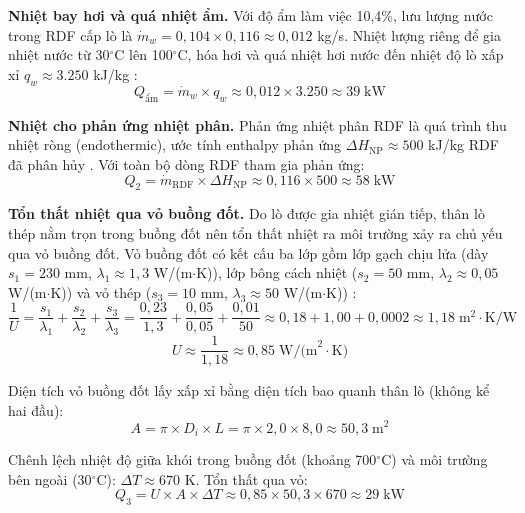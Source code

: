 \documentclass[../main.tex]{subfiles}
\begin{document}
\textbf{Nhiệt bay hơi và quá nhiệt ẩm.} Với độ ẩm làm việc 10,4\%, lưu lượng nước trong RDF cấp lò là $\dot{m}_w = 0{,}104 \times 0{,}116 \approx 0{,}012$ kg/s. Nhiệt lượng riêng để gia nhiệt nước từ 30$^\circ\mathrm{C}$ lên 100$^\circ\mathrm{C}$, hóa hơi và quá nhiệt hơi nước đến nhiệt độ lò xấp xỉ $q_w \approx 3.250$ kJ/kg \cite{Incropera2011}:
\begin{equation}
Q_{\text{ẩm}} = \dot{m}_w \times q_w \approx 0{,}012 \times 3.250 \approx 39\;\text{kW}
\label{eq:Q-am}
\end{equation}

\textbf{Nhiệt cho phản ứng nhiệt phân.} Phản ứng nhiệt phân RDF là quá trình thu nhiệt ròng (endothermic), ước tính enthalpy phản ứng $\Delta H_{\text{NP}} \approx 500$ kJ/kg RDF đã phân hủy \cite{Basu2013}. Với toàn bộ dòng RDF tham gia phản ứng:
\begin{equation}
Q_2 = \dot{m}_{\text{RDF}} \times \Delta H_{\text{NP}}
\approx 0{,}116 \times 500 \approx 58\;\text{kW}
\label{eq:Q2-phan-ung}
\end{equation}

\textbf{Tổn thất nhiệt qua vỏ buồng đốt.} Do lò được gia nhiệt gián tiếp, thân lò thép nằm trọn trong buồng đốt nên tổn thất nhiệt ra môi trường xảy ra chủ yếu qua vỏ buồng đốt. Vỏ buồng đốt có kết cấu ba lớp gồm lớp gạch chịu lửa (dày $s_1 = 230$ mm, $\lambda_1 \approx 1{,}3$ W/(m$\cdot$K)), lớp bông cách nhiệt ($s_2 = 50$ mm, $\lambda_2 \approx 0{,}05$ W/(m$\cdot$K)) và vỏ thép ($s_3 = 10$ mm, $\lambda_3 \approx 50$ W/(m$\cdot$K)) \cite{Incropera2011}:
\begin{equation}
\frac{1}{U} = \frac{s_1}{\lambda_1} + \frac{s_2}{\lambda_2} + \frac{s_3}{\lambda_3}
= \frac{0{,}23}{1{,}3} + \frac{0{,}05}{0{,}05} + \frac{0{,}01}{50}
\approx 0{,}18 + 1{,}00 + 0{,}0002 \approx 1{,}18\;\text{m}^2\!\cdot\!\text{K/W}
\end{equation}
\begin{equation}
U \approx \frac{1}{1{,}18} \approx 0{,}85\;\text{W/(m}^2\!\cdot\!\text{K)}
\end{equation}

Diện tích vỏ buồng đốt lấy xấp xỉ bằng diện tích bao quanh thân lò (không kể hai đầu):
\begin{equation}
A = \pi \times D_i \times L = \pi \times 2{,}0 \times 8{,}0 \approx 50{,}3\;\text{m}^2
\end{equation}

Chênh lệch nhiệt độ giữa khói trong buồng đốt (khoảng 700$^\circ\mathrm{C}$) và môi trường bên ngoài (30$^\circ\mathrm{C}$): $\Delta T \approx 670$ K. Tổn thất qua vỏ:
\begin{equation}
Q_3 = U \times A \times \Delta T
\approx 0{,}85 \times 50{,}3 \times 670 \approx 29\;\text{kW}
\end{equation}
\end{document}
